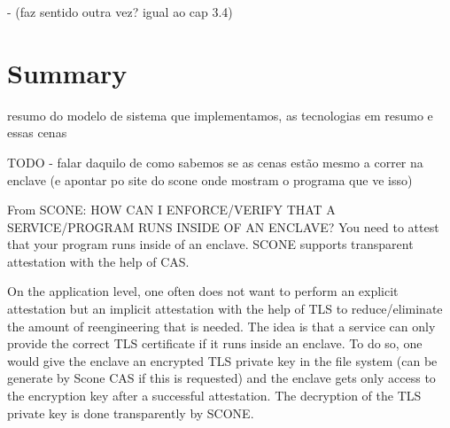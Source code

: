 - (faz sentido outra vez? igual ao cap 3.4)

\section{Summary}



resumo do modelo de sistema que implementamos, as tecnologias em resumo e essas cenas

TODO - falar daquilo de como sabemos se as cenas estão mesmo a correr na enclave (e apontar po site do scone onde mostram o programa que ve isso)

From SCONE: 
HOW CAN I ENFORCE/VERIFY THAT A SERVICE/PROGRAM RUNS INSIDE OF AN ENCLAVE?
You need to attest that your program runs inside of an enclave. SCONE supports transparent attestation with the help of CAS.

On the application level, one often does not want to perform an explicit attestation but an implicit attestation with the help of TLS to reduce/eliminate the amount of reengineering that is needed. The idea is that a service can only provide the correct TLS certificate if it runs inside an enclave. To do so, one would give the enclave an encrypted TLS private key in the file system (can be generate by Scone CAS if this is requested) and the enclave gets only access to the encryption key after a successful attestation. The decryption of the TLS private key is done transparently by SCONE.


